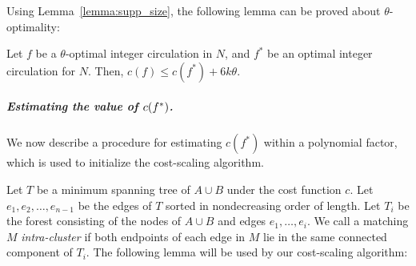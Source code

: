 \documentclass[a4paper,UKenglish,nolineno]{socg-lipics-v2019}
\def\cost{c}
\def\EMPH#1{\textcolor{BrickRed}{{\emph{#1}}}}
\begin{document}
Using Lemma~\ref{lemma:supp_size}, the following lemma can be proved about
$\theta$-optimality:

\begin{lemma}
\label{lemma:goldberg_cost_add}
Let $f$ be a $\theta$-optimal integer circulation in $N$,
and $f^*$ be an optimal integer circulation for $N$.
Then, $\cost(f) \leq \cost(f^*) + 6k\theta$.
\end{lemma}

%
%

\subparagraph{Estimating the value of \textbf{$\boldmath \cost(f^*)$}.}
We now describe a procedure for estimating $\cost(f^*)$ within a polynomial factor,
which is used to initialize the cost-scaling algorithm.

Let \EMPH{$T$} be a minimum spanning tree of $A \cup B$ under the cost function $c$.
Let $e_1, e_2, \ldots, e_{n-1}$ be the edges of $T$ sorted in nondecreasing order
of length.
Let \EMPH{$T_i$} be the forest consisting of the nodes of $A \cup B$ and
edges $e_1, \ldots, e_i$.
We call a matching $M$ \EMPH{intra-cluster} if both endpoints of
each edge in $M$ lie in the same connected component of $T_i$.
%
The following lemma will be used by our cost-scaling algorithm:
\end{document}
